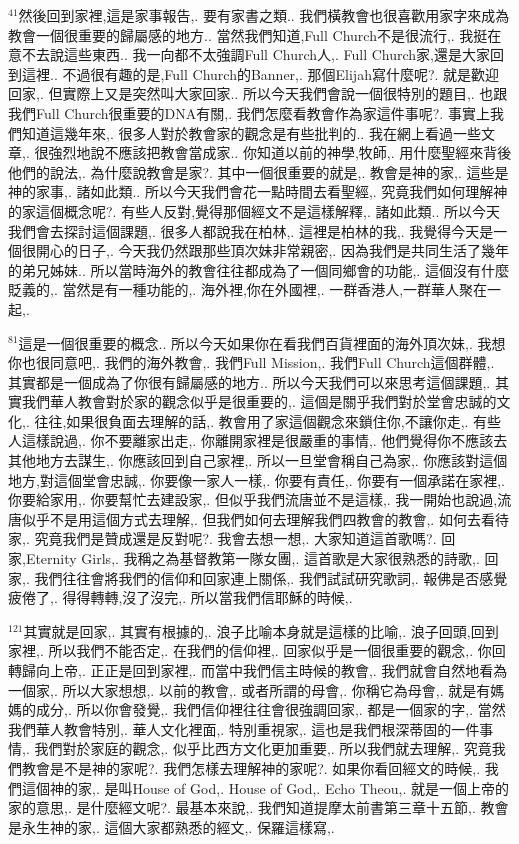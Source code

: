 \documentclass{book}
\begin{document}
$^{41}$然後回到家裡,這是家事報告,.
要有家書之類..
我們橫教會也很喜歡用家字來成為教會一個很重要的歸屬感的地方..
當然我們知道,Full Church不是很流行,.
我挺在意不去說這些東西..
我一向都不太強調Full Church人,.
Full Church家,還是大家回到這裡..
不過很有趣的是,Full Church的Banner,.
那個Elijah寫什麼呢?.
就是歡迎回家,.
但實際上又是突然叫大家回家..
所以今天我們會說一個很特別的題目,.
也跟我們Full Church很重要的DNA有關,.
我們怎麼看教會作為家這件事呢?.
事實上我們知道這幾年來,.
很多人對於教會家的觀念是有些批判的..
我在網上看過一些文章,.
很強烈地說不應該把教會當成家..
你知道以前的神學,牧師,.
用什麼聖經來背後他們的說法,.
為什麼說教會是家?.
其中一個很重要的就是,.
教會是神的家,.
這些是神的家事,.
諸如此類..
所以今天我們會花一點時間去看聖經,.
究竟我們如何理解神的家這個概念呢?.
有些人反對,覺得那個經文不是這樣解釋,.
諸如此類..
所以今天我們會去探討這個課題,.
很多人都說我在柏林,.
這裡是柏林的我,.
我覺得今天是一個很開心的日子,.
今天我仍然跟那些頂次妹非常親密,.
因為我們是共同生活了幾年的弟兄姊妹..
所以當時海外的教會往往都成為了一個同鄉會的功能,.
這個沒有什麼貶義的,.
當然是有一種功能的,.
海外裡,你在外國裡,.
一群香港人,一群華人聚在一起,.

$^{81}$這是一個很重要的概念..
所以今天如果你在看我們百貨裡面的海外頂次妹,.
我想你也很同意吧,.
我們的海外教會,.
我們Full Mission,.
我們Full Church這個群體,.
其實都是一個成為了你很有歸屬感的地方..
所以今天我們可以來思考這個課題,.
其實我們華人教會對於家的觀念似乎是很重要的,.
這個是關乎我們對於堂會忠誠的文化,.
往往,如果很負面去理解的話,.
教會用了家這個觀念來鎖住你,不讓你走,.
有些人這樣說過,.
你不要離家出走,.
你離開家裡是很嚴重的事情,.
他們覺得你不應該去其他地方去謀生,.
你應該回到自己家裡,.
所以一旦堂會稱自己為家,.
你應該對這個地方,對這個堂會忠誠,.
你要像一家人一樣,.
你要有責任,.
你要有一個承諾在家裡,.
你要給家用,.
你要幫忙去建設家,.
但似乎我們流唐並不是這樣,.
我一開始也說過,流唐似乎不是用這個方式去理解,.
但我們如何去理解我們四教會的教會,.
如何去看待家,.
究竟我們是贊成還是反對呢?.
我會去想一想,.
大家知道這首歌嗎?.
回家,Eternity Girls,.
我稱之為基督教第一隊女團,.
這首歌是大家很熟悉的詩歌,.
回家,.
我們往往會將我們的信仰和回家連上關係,.
我們試試研究歌詞,.
報佛是否感覺疲倦了,.
得得轉轉,沒了沒完,.
所以當我們信耶穌的時候,.

$^{121}$其實就是回家,.
其實有根據的,.
浪子比喻本身就是這樣的比喻,.
浪子回頭,回到家裡,.
所以我們不能否定,.
在我們的信仰裡,.
回家似乎是一個很重要的觀念,.
你回轉歸向上帝,.
正正是回到家裡,.
而當中我們信主時候的教會,.
我們就會自然地看為一個家,.
所以大家想想,.
以前的教會,.
或者所謂的母會,.
你稱它為母會,.
就是有媽媽的成分,.
所以你會發覺,.
我們信仰裡往往會很強調回家,.
都是一個家的字,.
當然我們華人教會特別,.
華人文化裡面,.
特別重視家,.
這也是我們根深蒂固的一件事情,.
我們對於家庭的觀念,.
似乎比西方文化更加重要,.
所以我們就去理解,.
究竟我們教會是不是神的家呢?.
我們怎樣去理解神的家呢?.
如果你看回經文的時候,.
我們這個神的家,.
是叫House of God,.
House of God,.
Echo Theou,.
就是一個上帝的家的意思,.
是什麼經文呢?.
最基本來說,.
我們知道提摩太前書第三章十五節,.
教會是永生神的家,.
這個大家都熟悉的經文,.
保羅這樣寫,.
\end{document}
